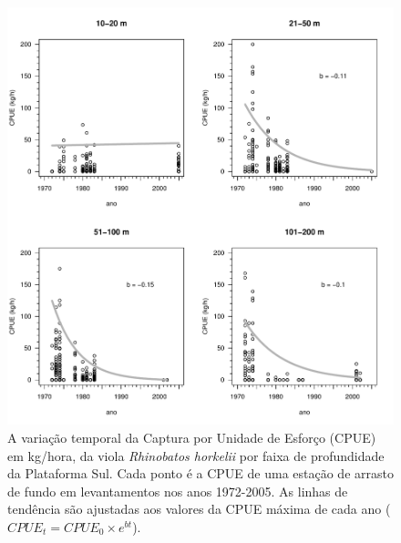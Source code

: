 \documentclass[a4paper,11pt,twoside,showtrims,onecolumn,openright,final]{memoir}
\begin{document}
%
%

\begin{figure}
\begin{center}
\includegraphics[width=\textwidth]{VIOLA_CPUEXPROFDECADAS}
\end{center}
\caption[Variação temporal da Captura por Unidade de Esforço em kg/hora de arrasto de fundo, 
	 da viola \emph{Rhinobatos horkelii} por faixa de profundidade da Plataforma Sul]
	{A variação temporal da  Captura por Unidade de Esforço (CPUE) em kg/hora, 
	 da viola \emph{Rhinobatos horkelii} por faixa de profundidade da Plataforma Sul. 
	 Cada ponto é a CPUE de uma estação de arrasto de fundo em levantamentos 
	 nos anos 1972-2005. As linhas de tendência são ajustadas aos valores 
	 da CPUE máxima de cada ano ($CPUE_{t} = CPUE_{0} \times e^{bt}$).}
\label{fig:viola-cpue-porano-dadospreteritos}
\end{figure}

\end{document}
